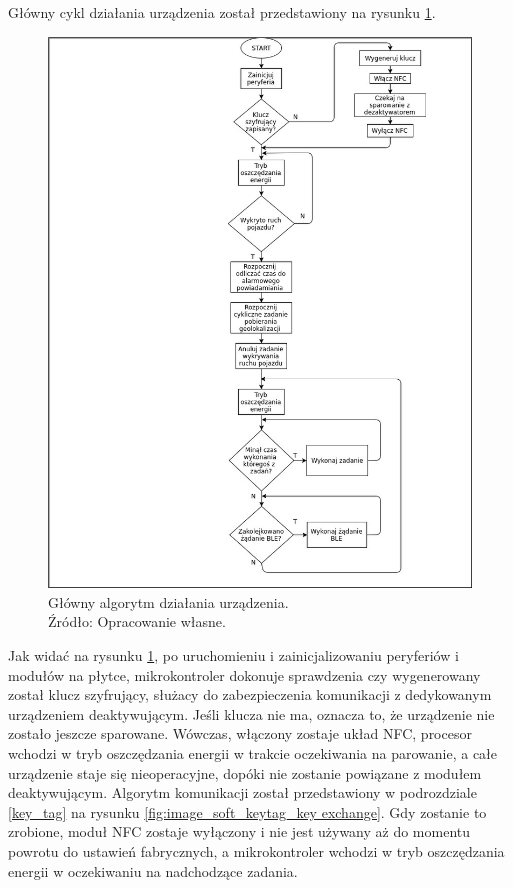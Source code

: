 Główny cykl działania urządzenia został przedstawiony na rysunku \ref{fig:image_soft_mainboard_main_alghoritm}.

\begin{figure}[H]
	\centering
	\includegraphics[width=16cm]{img/software/mainboard/Tracking_alghoritm.jpg}
	\caption{Główny algorytm działania urządzenia. 
	\\Źródło: Opracowanie własne.}
	\label{fig:image_soft_mainboard_main_alghoritm}
\end{figure}

Jak widać na rysunku \ref{fig:image_soft_mainboard_main_alghoritm}, po uruchomieniu i zainicjalizowaniu peryferiów i modułów na płytce, mikrokontroler dokonuje sprawdzenia czy wygenerowany został klucz szyfrujący, służacy do zabezpieczenia komunikacji z dedykowanym urządzeniem deaktywującym. Jeśli klucza nie ma, oznacza to, że urządzenie nie zostało jeszcze sparowane. Wówczas, włączony zostaje układ NFC, procesor wchodzi w tryb oszczędzania energii w trakcie oczekiwania na parowanie, a całe urządzenie staje się nieoperacyjne, dopóki nie zostanie powiązane z modułem deaktywującym. Algorytm komunikacji został przedstawiony w podrozdziale \ref{key_tag} na rysunku \ref{fig:image_soft_keytag_key exchange}. Gdy zostanie to zrobione, moduł NFC zostaje wyłączony i nie jest używany aż do momentu powrotu do ustawień fabrycznych, a mikrokontroler wchodzi w tryb oszczędzania energii w oczekiwaniu na nadchodzące zadania.

